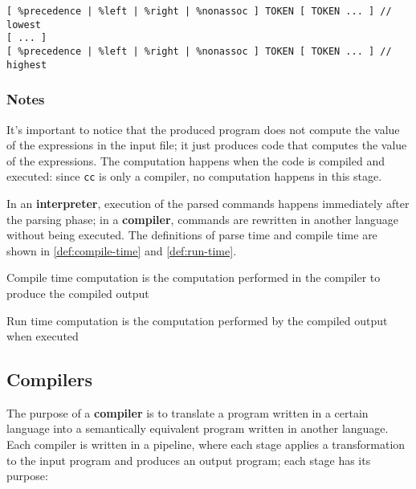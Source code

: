 \documentclass[english]{article}
\begin{document}
\begin{onepage}
  \begin{lstlisting}[language=LANCE, caption={Precedence and Associativity declaration}, label={lst:bison-precedence-associativity-declaration}]
[ %precedence | %left | %right | %nonassoc ] TOKEN [ TOKEN ... ] // lowest
[ ... ]
[ %precedence | %left | %right | %nonassoc ] TOKEN [ TOKEN ... ] // highest
\end{lstlisting}
\end{onepage}

\subsubsection{Notes}

It's important to notice that the produced program does not compute the value of the expressions in the input file;
it just produces \clang code that computes the value of the expressions.
The computation happens when the \clang code is compiled and executed:
since \texttt{cc} is only a compiler, no computation happens in this stage.

In an \textbf{interpreter}, execution of the  parsed commands happens immediately after the parsing phase;
in a \textbf{compiler}, commands are rewritten in another language without being executed.
The definitions of parse time and compile time are shown in \ref{def:compile-time} and \ref{def:run-time}.

\begin{definition}
  \label{def:compile-time}
  Compile time computation is the computation performed in the compiler to produce the compiled output
\end{definition}

\begin{definition}
  \label{def:run-time}
  Run time computation is the computation performed by the compiled output when executed
\end{definition}

\subsection{Compilers}

The purpose of a \textbf{compiler} is to translate a program written in a certain language into a semantically equivalent program written in another language.
Each compiler is written in a pipeline, where each stage applies a transformation to the input program and produces an output program;
each stage has its purpose:
\end{document}
